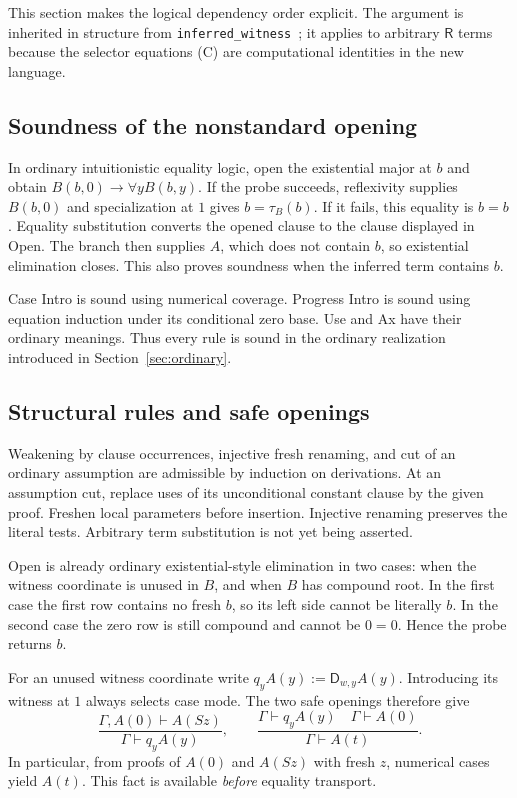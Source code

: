 \documentclass[11pt]{article}
\theoremstyle{definition}
\theoremstyle{remark}
\newcommand{\R}{\mathsf R}
\newcommand{\D}{\mathsf D}
\newcommand{\der}{\vdash}
\begin{document}
This section makes the logical dependency order explicit.
The argument is inherited in structure from
\texttt{inferred\_witness}~\cite{inferred}; it applies to
arbitrary $\R$ terms because the selector equations (C)
are computational identities in the new language.

\subsection{Soundness of the nonstandard opening}

In ordinary intuitionistic equality logic, open the
existential major at $b$ and obtain
$B(b,0)\to\forall y B(b,y)$.
If the probe succeeds, reflexivity supplies $B(b,0)$ and
specialization at $1$ gives $b=\tau_B(b)$.
If it fails, this equality is $b=b$.
Equality substitution converts the opened clause to the
clause displayed in Open. The branch then supplies $A$,
which does not contain $b$, so existential elimination closes.
This also proves soundness when the inferred term contains $b$.

Case Intro is sound using numerical coverage. Progress Intro
is sound using equation induction under its conditional
zero base. Use and Ax have their ordinary meanings.
Thus every rule is sound in the ordinary realization introduced
in Section~\ref{sec:ordinary}.

\subsection{Structural rules and safe openings}

Weakening by clause occurrences, injective fresh renaming,
and cut of an ordinary assumption are admissible by induction
on derivations. At an assumption cut, replace uses of its
unconditional constant clause by the given proof. Freshen
local parameters before insertion. Injective renaming preserves
the literal tests. Arbitrary term substitution is not yet
being asserted.

Open is already ordinary existential-style elimination
in two cases: when the witness coordinate is unused in
$B$, and when $B$ has compound root. In the first case the
first row contains no fresh $b$, so its left side cannot
be literally $b$. In the second case the zero row is still
compound and cannot be $0=0$. Hence the probe returns $b$.

For an unused witness coordinate write
$q_yA(y):=\D_{w,y}A(y)$. Introducing its witness at $1$
always selects case mode. The two safe openings therefore give
\[
 \frac{\Gamma,A(0)\der A(Sz)}{\Gamma\der q_yA(y)},\qquad
 \frac{\Gamma\der q_yA(y)\quad\Gamma\der A(0)}
      {\Gamma\der A(t)}.
 \tag{Closure}
\]
In particular, from proofs of $A(0)$ and $A(Sz)$ with fresh
$z$, numerical cases yield $A(t)$. This fact is available
\emph{before} equality transport.
\end{document}
